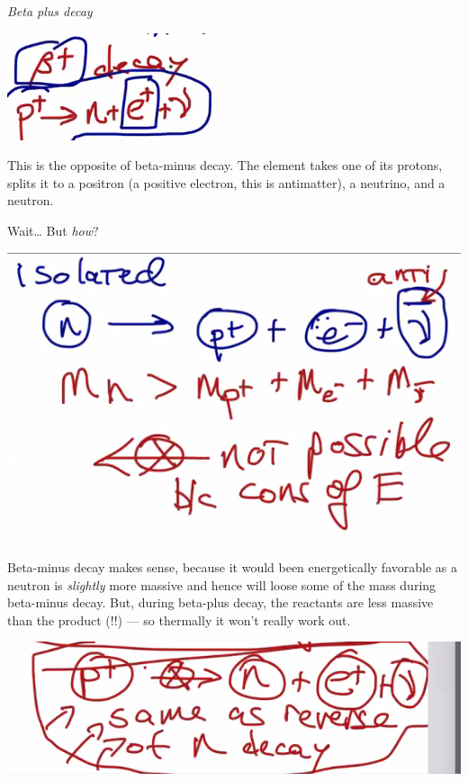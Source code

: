 \documentclass[letterpaper]{article}
\begin{document}
\emph{Beta plus decay}

\begin{center}
\includegraphics[width=.9\linewidth]{betaplusdecay.png}
\end{center}

This is the opposite of beta-minus decay. The element takes one of its
protons, splits it to a positron (a positive electron, this is
antimatter), a neutrino, and a neutron.

Wait\ldots{} But \emph{how}?

\begin{center}
\includegraphics[width=.9\linewidth]{betadecaybackwards.png}
\end{center}

Beta-minus decay makes sense, because it would been energetically
favorable as a neutron is \emph{slightly} more massive and hence will loose
some of the mass during beta-minus decay. But, during beta-plus decay,
the reactants are less massive than the product (!!) --- so thermally it
won't really work out.

\begin{center}
\includegraphics[width=.9\linewidth]{betadecayisreallybackwards.png}
\end{center}
\end{document}
